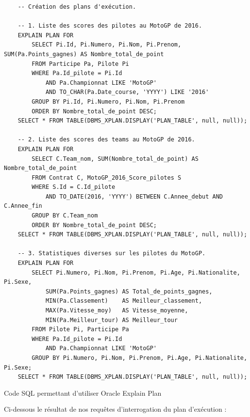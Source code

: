 \documentclass[12pt,a4paper]{article}
\newenvironment{code}{\captionsetup{type=listing}}{}
\begin{document}
\begin{code}
    \begin{verbatim}
    -- Création des plans d'exécution.

    -- 1. Liste des scores des pilotes au MotoGP de 2016.
    EXPLAIN PLAN FOR
        SELECT Pi.Id, Pi.Numero, Pi.Nom, Pi.Prenom, SUM(Pa.Points_gagnes) AS Nombre_total_de_point
        FROM Participe Pa, Pilote Pi
        WHERE Pa.Id_pilote = Pi.Id
            AND Pa.Championnat LIKE 'MotoGP'
            AND TO_CHAR(Pa.Date_course, 'YYYY') LIKE '2016'
        GROUP BY Pi.Id, Pi.Numero, Pi.Nom, Pi.Prenom
        ORDER BY Nombre_total_de_point DESC;
    SELECT * FROM TABLE(DBMS_XPLAN.DISPLAY('PLAN_TABLE', null, null));

    -- 2. Liste des scores des teams au MotoGP de 2016.
    EXPLAIN PLAN FOR
        SELECT C.Team_nom, SUM(Nombre_total_de_point) AS Nombre_total_de_point
        FROM Contrat C, MotoGP_2016_Score_pilotes S
        WHERE S.Id = C.Id_pilote
            AND TO_DATE(2016, 'YYYY') BETWEEN C.Annee_debut AND C.Annee_fin
        GROUP BY C.Team_nom
        ORDER BY Nombre_total_de_point DESC;
    SELECT * FROM TABLE(DBMS_XPLAN.DISPLAY('PLAN_TABLE', null, null));

    -- 3. Statistiques diverses sur les pilotes du MotoGP.
    EXPLAIN PLAN FOR
        SELECT Pi.Numero, Pi.Nom, Pi.Prenom, Pi.Age, Pi.Nationalite, Pi.Sexe,
            SUM(Pa.Points_gagnes) AS Total_de_points_gagnes,
            MIN(Pa.Classement)    AS Meilleur_classement,
            MAX(Pa.Vitesse_moy)   AS Vitesse_moyenne,
            MIN(Pa.Meilleur_tour) AS Meilleur_tour
        FROM Pilote Pi, Participe Pa
        WHERE Pa.Id_pilote = Pi.Id
            AND Pa.Championnat LIKE 'MotoGP'
        GROUP BY Pi.Numero, Pi.Nom, Pi.Prenom, Pi.Age, Pi.Nationalite, Pi.Sexe;
    SELECT * FROM TABLE(DBMS_XPLAN.DISPLAY('PLAN_TABLE', null, null));
    \end{verbatim}
    \caption{Code SQL permettant d'utiliser Oracle Explain Plan}
    \label{lst.expplan}
\end{code}

Ci-dessous le résultat de nos requêtes d'interrogation du plan d'exécution :
\end{document}
